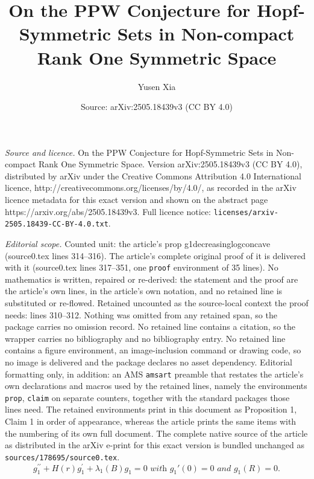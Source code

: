 \documentclass[10pt,a4paper]{amsart}
\title{On the PPW Conjecture for Hopf-Symmetric Sets in Non-compact Rank One Symmetric Space}
\author{Yusen Xia}
\date{Source: arXiv:2505.18439v3 (CC BY 4.0)}
\begin{document}
\maketitle

\noindent\emph{Source and licence.} On the PPW Conjecture for Hopf-Symmetric Sets in Non-compact Rank One Symmetric Space. Version arXiv:2505.18439v3 (CC BY 4.0), distributed by arXiv under the Creative Commons Attribution 4.0 International licence, http://creativecommons.org/licenses/by/4.0/, as recorded in the arXiv licence metadata for this exact version and shown on the abstract page https://arxiv.org/abs/2505.18439v3. Full licence notice: \texttt{licenses/arxiv-2505.18439-CC-BY-4.0.txt}.\par\smallskip

\noindent\textit{Editorial scope.} Counted unit: the article's prop g1decreasinglogconcave (source0.tex lines 314--316). The article's complete original proof of it is delivered with it (source0.tex lines 317--351, one \texttt{proof} environment of 35 lines). No mathematics is written, repaired or re-derived: the statement and the proof are the article's own lines, in the article's own notation, and no retained line is substituted or re-flowed.  Retained uncounted as the source-local context the proof needs: lines 310--312.  Nothing was omitted from any retained span, so the package carries no omission record.  No retained line contains a citation, so the wrapper carries no bibliography and no bibliography entry.  No retained line contains a figure environment, an image-inclusion command or drawing code, so no image is delivered and the package declares no asset dependency.  Editorial formatting only, in addition: an AMS \texttt{amsart} preamble that restates the article's own declarations and macros used by the retained lines, namely the environments \texttt{prop}, \texttt{claim} on separate counters, together with the standard packages those lines need.  The retained environments print in this document as Proposition 1, Claim 1 in order of appearance, whereas the article prints the same items with the numbering of its own full document.  The complete native source of the article as distributed in the arXiv e-print for this exact version is bundled unchanged as \texttt{sources/178695/source0.tex}.
\begin{equation}\label{FirstEigenODE}
    g_1^{\prime \prime}+H(r) g_1^{\prime}+\lambda_1(B)  g_1=0 \textit{ with } g_1'(0) = 0 \textit{ and } g_1(R) = 0.
\end{equation}
\end{document}
